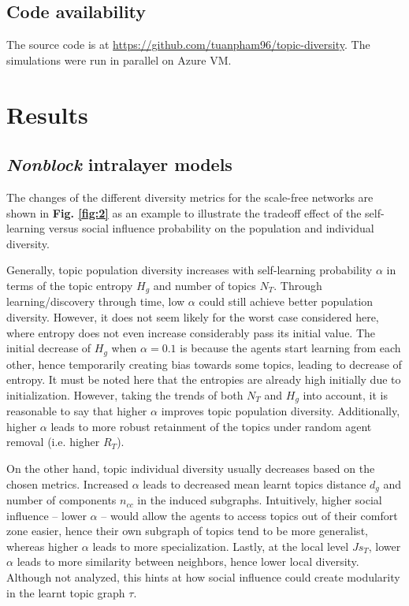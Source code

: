 \documentclass{svproc}
\begin{document}
\subsection{Code availability}

The source code is at \url{https://github.com/tuanpham96/topic-diversity}. The simulations were run in parallel on Azure VM.

\section{Results}



\subsection{\textit{Nonblock} intralayer models} \label{results-nonblock}

The changes of the different diversity metrics for the scale-free networks are shown in \textbf{Fig. \ref{fig:2}} as an example to illustrate the tradeoff effect of the self-learning versus social influence probability on the population and individual diversity.

Generally, topic population diversity increases with self-learning probability $\alpha$ in terms of the topic entropy $H_g$ and number of topics $N_T$. Through learning/discovery through time, low $\alpha$ could still achieve better population diversity. However, it does not seem likely for the worst case considered here, where entropy does not even increase considerably pass its initial value. The initial decrease of $H_g$ when $\alpha = 0.1$ is because the agents start learning from each other, hence temporarily creating bias towards some topics, leading to decrease of entropy. It must be noted here that the entropies are already high initially due to initialization. However, taking the trends of both $N_T$ and $H_g$ into account, it is reasonable to say that higher $\alpha$ improves topic population diversity. Additionally, higher $\alpha$ leads to more robust retainment of the topics under random agent removal (i.e. higher $R_T$).

On the other hand, topic individual diversity usually decreases based on the chosen metrics. Increased $\alpha$ leads to decreased mean learnt topics distance $d_g$ and number of components $n_{cc}$ in the induced subgraphs. Intuitively, higher social influence  -- lower $\alpha$ -- would allow the agents to access topics out of their comfort zone easier, hence their own subgraph of topics tend to be more generalist, whereas higher $\alpha$ leads to more specialization. Lastly, at the local level $Js_T$, lower $\alpha$ leads to more similarity between neighbors, hence lower local diversity. Although not analyzed, this hints at how social influence could create modularity in the learnt topic graph $\tau$.
\end{document}
